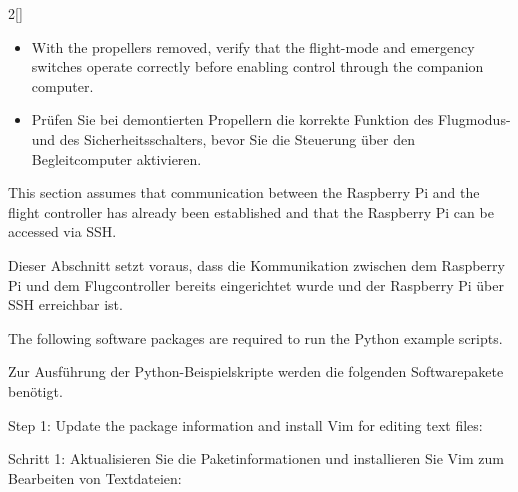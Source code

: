 \begin{paracol}{2}[]
\coleng

\begin{itemize}
  \item With the propellers removed, verify that the flight-mode and emergency switches operate correctly before enabling control through the companion computer.
\end{itemize}

\colger

\begin{itemize}
  \item Prüfen Sie bei demontierten Propellern die korrekte Funktion des Flugmodus- und des Sicherheitsschalters, bevor Sie die Steuerung über den Begleitcomputer aktivieren.
\end{itemize}

\colende

\renewcommand{\deutschertitel}{Testflug mit dem Raspberry Pi}
\renewcommand{\englischertitel}{Test Flight Using the Raspberry Pi}
\makrounterabschnitt

This section assumes that communication between the Raspberry Pi and the flight controller has already been established and that the Raspberry Pi can be accessed via SSH.

\colger

Dieser Abschnitt setzt voraus, dass die Kommunikation zwischen dem Raspberry Pi und dem Flugcontroller bereits eingerichtet wurde und der Raspberry Pi über SSH erreichbar ist.

\coleng

The following software packages are required to run the Python example scripts.

\colger

Zur Ausführung der Python-Beispielskripte werden die folgenden Softwarepakete benötigt.

\coleng

Step 1: Update the package information and install Vim for editing text files:

\colger

Schritt 1: Aktualisieren Sie die Paketinformationen und installieren Sie Vim zum Bearbeiten von Textdateien:

\colende



\end{paracol}
